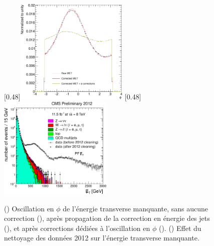 \begin{figure}[tbp] \centering
    \subcaptionbox{\label{fig:met_phi}}[0.48\textwidth]{\includegraphics[width=0.48\textwidth]{chapitre7/figs/met_phi_corrections.pdf}}
    \subcaptionbox{\label{fig:met_cleaning}}[0.48\textwidth]{\includegraphics[width=0.48\textwidth]{chapitre7/figs/met_cleaning.pdf}}
    \caption{() Oscillation en $\phi$ de l'énergie transverse manquante, sans aucune correction (\rouge), après propagation de la correction en énergie des jets (\violet), et après corrections dédiées à l'oscillation en $\phi$ (\vertc). () Effet du nettoyage des données 2012 sur l'énergie transverse manquante.}
\end{figure}

